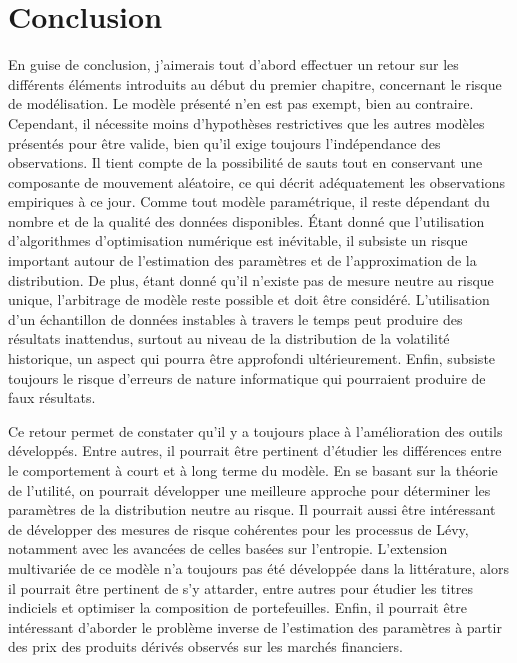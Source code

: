 \chapter*{Conclusion} %


En guise de conclusion, j'aimerais tout d'abord effectuer un retour
sur les différents éléments introduits au début du premier chapitre,
concernant le risque de modélisation. Le modèle présenté n'en est pas
exempt, bien au contraire. Cependant, il
nécessite moins d'hypothèses restrictives que les autres modèles
présentés pour être valide, bien qu'il exige toujours l'indépendance
des observations. Il tient compte de la possibilité de sauts tout en
conservant une composante de mouvement aléatoire, ce qui décrit
adéquatement les observations empiriques à ce jour. Comme tout modèle
paramétrique, il reste dépendant du nombre et de la qualité des
données disponibles. Étant donné que l'utilisation d'algorithmes
d'optimisation numérique est inévitable, il subsiste un risque
important autour de l'estimation des paramètres et de l'approximation de la distribution. De plus, étant donné qu'il n'existe pas
de mesure neutre au risque unique, l'arbitrage de modèle reste
possible et doit être considéré. L'utilisation d'un échantillon de
données instables à travers le temps peut produire des résultats
inattendus, surtout au niveau de la distribution de la volatilité
historique, un aspect qui pourra être approfondi ultérieurement.
Enfin, subsiste toujours le risque d'erreurs de nature informatique
qui pourraient produire de faux résultats.

Ce retour permet de constater qu'il y a toujours place à
l'amélioration des outils développés. Entre autres, il pourrait être
pertinent d'étudier les différences entre le comportement à court et à long terme du modèle. En se basant sur la théorie de
l'utilité, on pourrait développer une meilleure approche pour
déterminer les paramètres de la distribution neutre au risque. Il
pourrait aussi être intéressant de développer des mesures de risque
cohérentes pour les processus de Lévy, notamment
avec les avancées de celles basées sur l'entropie. L'extension
multivariée de ce modèle n'a toujours pas été développée dans la
littérature, alors il pourrait être pertinent de s'y attarder, entre
autres pour étudier les titres indiciels et optimiser la composition
de portefeuilles. Enfin, il pourrait être intéressant d'aborder le
problème inverse de l'estimation des paramètres à partir des prix des
produits dérivés observés sur les marchés financiers.

